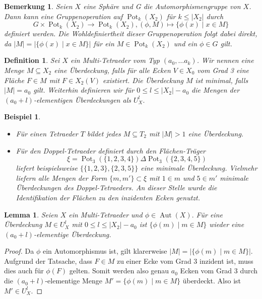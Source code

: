 \documentclass[12pt,titlepage,twoside,cleardoublepage]{article}
\theoremstyle{nummermitklammern}
\newtheorem{lemma}[temp]{Lemma}
\newtheorem{bsp}[temp]{Beispiel}
\newtheorem{definition}[temp]{Definition}
\newtheorem{bemerkung}[temp]{Bemerkung}
\newtheorem{definition}[zahl]{Definition}
\newtheorem{lemma}[zahl]{Lemma}
\newtheorem{bsp}[zahl]{Beispiel}
\newtheorem{bemerkung}[zahl]{Bemerkung}
\numberwithin{equation}{section}
\DeclareMathOperator{\Aut}{Aut}
\DeclareMathOperator{\Pot}{Pot}
\begin{document}
\begin{bemerkung}\label{bemgruppe}
Seien $X$ eine Sphäre und G die Automorphismengruppe von $X$. Dann kann eine Gruppenoperation auf $\Pot_k(X_2)$ für $k \leq \vert X_2 \vert  $ durch 
\[
G\times \Pot_k(X_2) \to \Pot_k(X_2),(\phi , M)\mapsto \{\phi(x)\mid x\in M\}
\]
definiert werden. Die Wohldefiniertheit dieser Gruppenoperation folgt dabei direkt, da $\vert M\vert=\vert\{\phi (x)\mid x\in M\}\vert$ für ein $M\in \Pot_k(X_2)$ und ein $\phi\in G$ gilt.
\end{bemerkung}
\begin{definition}
Sei $X$ ein Multi-Tetraeder vom Typ $(a_0,\ldots a_k)$. Wir nennen eine Menge $M\subseteq X_2$ eine \emph{Überdeckung}, falls für alle Ecken $V\in X_0$ vom Grad 3 eine Fläche $F\in M$ mit $F\in X_2(V)$ existiert. Die Überdeckung $M$ ist \emph{minimal}, falls $\vert M\vert=a_0$ gilt.
Weiterhin definieren wir für $0\leq l\leq \vert X_2\vert -a_0$ die Mengen der $(a_0+l)$-elementigen Überdeckungen als
 $U_X^l.$ 
\end{definition}
\begin{bsp}
\begin{itemize}
\item Für einen Tetraeder $T$ bildet jedes $M\subseteq T_2$ mit $\vert M\vert >1 $ eine Überdeckung. 
\item Für den Doppel-Tetraeder definiert durch den Flächen-Träger 
\[
\xi=\Pot_3(\{1,2,3,4\})\Delta \Pot_3(\{2,3,4,5\})
\]
liefert beispielsweise $\{\{1,2,3\},\{2,3,5\}\}$ eine minimale Überdeckung. Vielmehr liefern alle Mengen der Form $\{m,m'\}\subset \xi$ mit $1\in m$ und $5\in m'$ minimale Überdeckungen des Doppel-Tetraeders. An dieser Stelle wurde die Identifikation der Flächen zu den inzidenten Ecken genutzt.
\end{itemize}
\end{bsp}
\begin{lemma}
Seien $X$ ein Multi-Tetraeder und $\phi \in \Aut(X).$ Für eine Überdeckung $M\in U_X^l$ mit  $0\leq l\leq \vert X_2\vert -a_0$ ist $\{\phi(m)\mid m\in M\}$ wieder eine $(a_0+l)$-elementige Überdeckung. \end{lemma}
\begin{proof}
 Da $\phi$ ein Automorphismus ist, gilt
klarerweise $\vert M\vert =\vert\{\phi(m)\mid m\in M\}\vert$.
 Aufgrund der Tatsache, dass $F\in M$ zu einer Ecke vom Grad 3 inzident ist, muss dies auch für $\phi(F)$ gelten. Somit werden also genau $a_0$ Ecken vom Grad 3 durch die $(a_0+l)$-elementige Menge $M'=\{\phi(m)\mid m\in M\}$ überdeckt. Also ist $M'\in U^l_X.$
\end{proof}
\end{document}
